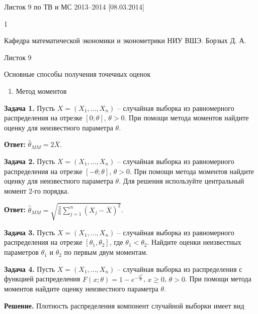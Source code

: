 

Листок 9 по ТВ и МС 2013--2014 [08.03.2014]







1

Кафедра математической экономики и эконометрики НИУ ВШЭ. Борзых Д. А.

Листок 9

Основные способы получения точечных оценок



\begin{enumerate}
\item  Метод моментов
\end{enumerate}



\textbf{Задача 1.} Пусть $X=\left(X_{1} ,...,X_{n} \right)$ -- случайная выборка из равномерного распределения на отрезке $\left[0;\theta \right]$, $\theta >0$. При помощи метода моментов найдите оценку для неизвестного параметра $\theta $.

\textbf{Ответ:} $\widehat{\theta }_{MM} =2\overline{X}$.



\textbf{Задача 2.} Пусть $X=\left(X_{1} ,...,X_{n} \right)$ -- случайная выборка из равномерного распределения на отрезке $\left[-\theta ;\theta \right]$, $\theta >0$. При помощи метода моментов найдите оценку для неизвестного параметра $\theta $. Для решения используйте центральный момент 2-го порядка.

\textbf{Ответ:} $\widehat{\theta }_{MM} =\sqrt{{\tfrac{3}{n}} \sum _{j=1}^{n}\left(X_{j} -\overline{X}\right)^{2}  } $.



\textbf{Задача 3.} Пусть $X=\left(X_{1} ,...,X_{n} \right)$ -- случайная выборка из равномерного распределения на отрезке $\left[\theta _{1} ,\theta _{2} \right]$, где $\theta _{1} <\theta _{2} $. Найдите оценки неизвестных параметров $\theta _{1} $ и $\theta _{2} $ по первым двум моментам.



\textbf{Задача 4.} Пусть $X=\left(X_{1} ,...,X_{n} \right)$ -- случайная выборка из распределения с функцией распределения $F\left(x;\theta \right)=1-e^{-{\tfrac{x^{2} }{\theta }} } $, $x\ge 0$, $\theta >0$. При помощи метода моментов найдите оценку неизвестного параметра $\theta $.

\textbf{Решение. }Плотность распределения компонент случайной выборки имеет вид 

